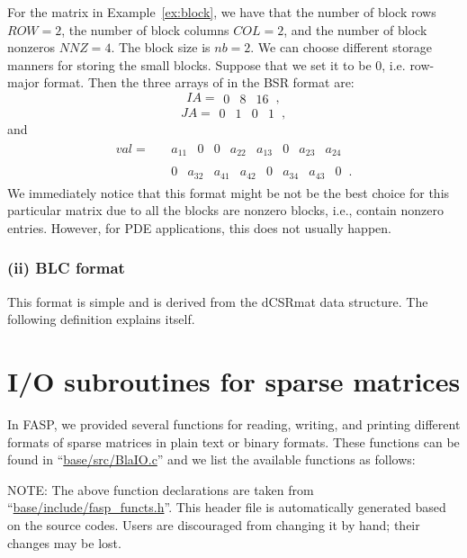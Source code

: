 \documentclass[11pt]{memoir}
\begin{document}
For the matrix in Example~\ref{ex:block}, we have that the number of block rows $ROW=2$, the number of block columns $COL=2$, and the number of block nonzeros $NNZ = 4$. The block size is $nb = 2$. We can choose different storage manners for storing the small blocks. Suppose that we set it to be 0, i.e. row-major format. Then the three arrays of in the BSR format are:
$$
IA =
\begin{array}{||c||c||c||c||}0&8&16\end{array}\, ,
$$
$$
JA =
\begin{array}{||c|c||c|c||}
0&1&0&1\end{array}\, ,
$$
and
\begin{align*}
val = \;\; &
\begin{array}{||c|c|c|c||c|c|c|c||}
a_{11} & 0 & 0 & a_{22} & a_{13} & 0 & a_{23} & a_{24}
\end{array}\,
\\
& \begin{array}{||c|c|c|c||c|c|c|c||}
0 & a_{32} & a_{41} & a_{42} & 0 & a_{34} & a_{43} & 0
\end{array}\,.
\end{align*}
We immediately notice that this format might be not be the best choice for this particular matrix due to all the blocks are nonzero blocks, i.e., contain nonzero entries. However, for PDE applications, this does not usually happen. 

\subsubsection*{(ii) BLC format}
This format is simple and is derived from the dCSRmat data structure. The following definition explains itself. 
%

%

\section{I/O subroutines for sparse matrices}

In FASP, we provided several functions for reading, writing, and printing different formats of sparse matrices in plain text or binary formats. These functions can be found in ``\url{base/src/BlaIO.c}'' and we list the available functions as follows:
%

%
\begin{snugshade}\noindent
  NOTE: The above function declarations are taken from
  ``\url{base/include/fasp\_functs.h}''. This header file is
  automatically generated based on the source codes. Users are discouraged
  from changing it by hand; their changes may be lost. 
\end{snugshade}
\end{document}
